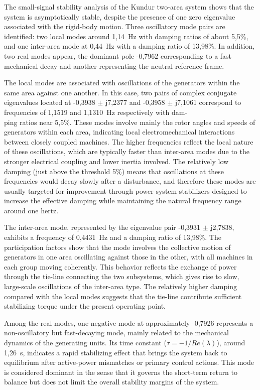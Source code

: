 The small-signal stability analysis of the Kundur two-area system shows that the system is asymptotically stable, 
despite the presence of one zero eigenvalue associated with the rigid-body motion. Three oscillatory
mode pairs are identified: two local modes around 1,14~Hz with damping ratios of about 5,5\%, 
and one inter-area mode at 0,44~Hz with a damping ratio of 13,98\%. In addition, two real modes appear,
the dominant pole -0,7962 corresponding to a fast mechanical decay and another representing the neutral 
reference frame.

The local modes are associated with oscillations of the generators within the same area against one another. 
In this case, two pairs of complex conjugate eigenvalues located at -0,3938 $\pm$ j7,2377 and -0,3958 $\pm$ j7,1061 correspond to frequencies
 of 1,1519 and 1,1310~Hz respectively with dam-\\ping ratios near 5,5\%. These modes involve mainly the rotor angles and 
 speeds of generators within each area, indicating local electromechanical interactions between closely coupled machines. The higher frequencies reflect the local nature of these oscillations, which are typically faster than inter-area modes due to the stronger electrical coupling and lower inertia involved. 
 The relatively low damping (just above the threshold 5\%) means that oscillations at these frequencies would decay slowly after a 
 disturbance, and therefore these modes are usually targeted for improvement through power system stabilizers designed to increase 
 the effective damping while maintaining the natural frequency range around one hertz.

The inter-area mode, represented by the eigenvalue pair -0,3931 $\pm$ j2,7838, exhibits a frequency of  0,4431~Hz and a damping 
ratio of 13,98\%. The participation factors show that the mode involves the collective motion of generators in one area oscillating 
against those in the other, with all machines in each group moving coherently. This behavior reflects the exchange of power 
through the tie-line connecting the two subsystems, which gives rise to slow, large-scale oscillations of the inter-area type. 
The relatively higher damping compared with the local modes suggests that the tie-line 
contribute sufficient stabilizing torque under the present operating point. 

Among the real modes, one negative mode at approximately -0,7926 represents a non-oscillatory but fast-decaying mode, 
mainly related to the mechanical dynamics of the generating units. Its time constant ($\tau = -1/Re(\lambda)$), around 1,26~s, indicates a rapid stabilizing
effect that brings the system back to equilibrium after active-power mismatches or primary control actions. This mode is considered 
dominant in the sense that it governs the short-term return to balance but does not limit the overall stability margins of the system.

